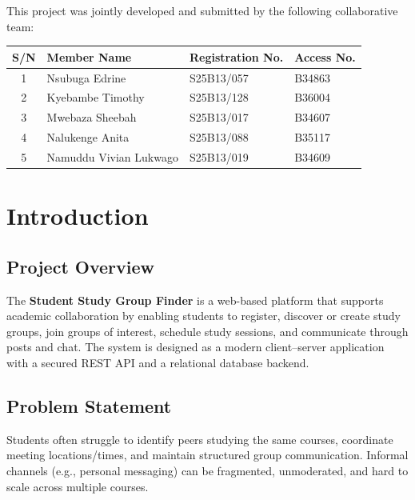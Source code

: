 \documentclass[12pt]{article}
\begin{document}
\noindent
This project was jointly developed and submitted by the following collaborative team:

\vspace{0.4cm}

\noindent
\begin{tabularx}{\textwidth}{|c|X|l|l|}
\hline
\textbf{S/N} & \textbf{Member Name} & \textbf{Registration No.} & \textbf{Access No.} \\ \hline
1 & Nsubuga Edrine & S25B13/057 & B34863 \\ \hline
2 & Kyebambe Timothy & S25B13/128 & B36004 \\ \hline
3 & Mwebaza Sheebah & S25B13/017 & B34607 \\ \hline
4 & Nalukenge Anita & S25B13/088 & B35117 \\ \hline
5 & Namuddu Vivian Lukwago & S25B13/019 & B34609 \\ \hline
\end{tabularx}

\newpage

\tableofcontents
\newpage
\listoffigures
\newpage

\section{Introduction}
\subsection{Project Overview}
The \textbf{Student Study Group Finder} is a web-based platform that supports academic collaboration by enabling students to register, discover or create study groups, join groups of interest, schedule study sessions, and communicate through posts and chat. The system is designed as a modern client--server application with a secured REST API and a relational database backend.

\subsection{Problem Statement}
Students often struggle to identify peers studying the same courses, coordinate meeting locations/times, and maintain structured group communication. Informal channels (e.g., personal messaging) can be fragmented, unmoderated, and hard to scale across multiple courses.
\end{document}
